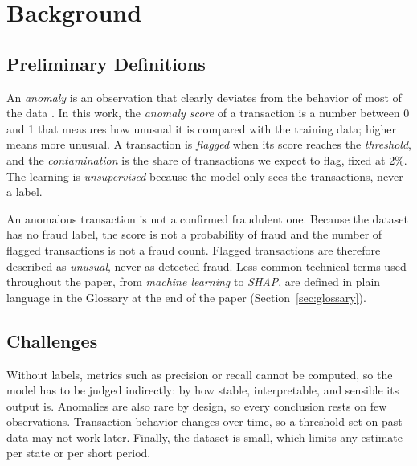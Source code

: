 \documentclass[journal]{IEEEtran}
\begin{document}

\section{Background}

\subsection{Preliminary Definitions}

An \textit{anomaly} is an observation that clearly deviates from the behavior of most of the data \cite{chandola2009anomaly}. In this work, the \textit{anomaly score} of a transaction is a number between 0 and 1 that measures how unusual it is compared with the training data; higher means more unusual. A transaction is \textit{flagged} when its score reaches the \textit{threshold}, and the \textit{contamination} is the share of transactions we expect to flag, fixed at 2\%. The learning is \textit{unsupervised} because the model only sees the transactions, never a label.

An anomalous transaction is not a confirmed fraudulent one. Because the dataset has no fraud label, the score is not a probability of fraud and the number of flagged transactions is not a fraud count. Flagged transactions are therefore described as \emph{unusual}, never as detected fraud. Less common technical terms used throughout the paper, from \textit{machine learning} to \textit{SHAP}, are defined in plain language in the Glossary at the end of the paper (Section~\ref{sec:glossary}).

\subsection{Challenges}

Without labels, metrics such as precision or recall cannot be computed, so the model has to be judged indirectly: by how stable, interpretable, and sensible its output is. Anomalies are also rare by design, so every conclusion rests on few observations. Transaction behavior changes over time, so a threshold set on past data may not work later. Finally, the dataset is small, which limits any estimate per state or per short period.

\end{document}
